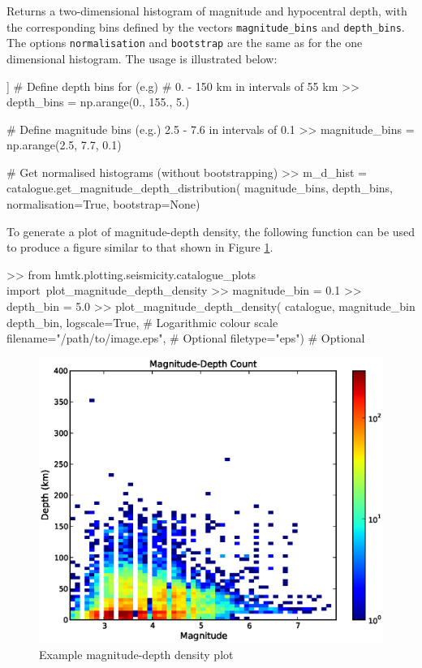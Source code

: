 \begin{itemize}
Returns a two-dimensional histogram of magnitude and hypocentral depth, with the corresponding bins defined by the vectors \verb=magnitude_bins= and \verb=depth_bins=. The options \verb=normalisation= and \verb=bootstrap= are the same as for the one dimensional histogram. The usage is illustrated below:

\begin{python}[frame=single]]
# Define depth bins for (e.g) 
# 0. - 150 km in intervals of 55 km
>> depth_bins = np.arange(0., 155., 5.)

# Define magnitude bins (e.g.) 2.5 - 7.6 in intervals of 0.1
>> magnitude_bins = np.arange(2.5, 7.7, 0.1)

# Get normalised histograms (without bootstrapping)
>> m_d_hist = catalogue.get_magnitude_depth_distribution(
    magnitude_bins,
    depth_bins,
    normalisation=True,
    bootstrap=None)
\end{python}

To generate a plot of magnitude-depth density, the following function can be used to produce a figure similar to that shown in Figure \ref{fig:mag_depth_density}.

\begin{python}[frame=single]
>> from hmtk.plotting.seismicity.catalogue_plots import\
     plot_magnitude_depth_density
>> magnitude_bin = 0.1
>> depth_bin = 5.0 
>> plot_magnitude_depth_density(
    catalogue,
    magnitude_bin
    depth_bin,
    logscale=True, \# Logarithmic colour scale
    filename="/path/to/image.eps", \# Optional
    filetype="eps")   \# Optional
\end{python}

\begin{figure}[htb]
  \centering
      \includegraphics[trim=10mm 10mm 10mm 10mm, clip, width=14cm]{./figures/magnitude_depth_density.eps}
  \caption{Example magnitude-depth density plot}
  \label{fig:mag_depth_density}
\end{figure}


\end{itemize}
